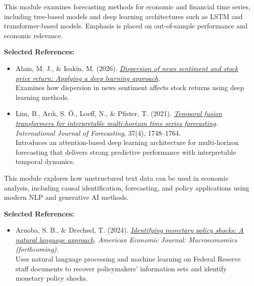 \documentclass[11pt]{article}
\begin{document}
\begin{description}[leftmargin=0cm, labelindent=0cm, itemsep=1em]
\begin{itemize}[leftmargin=1.5em]
\end{itemize}


\item[\textbf{Module 6: Financial and Macroeconomic Forecasting Using ML and Deep Learning}]
This module examines forecasting methods for economic and financial time series, including tree-based models and deep learning architectures such as LSTM and transformer-based models. Emphasis is placed on out-of-sample performance and economic relevance.

\vspace{0.3em}
\textbf{Selected References:}
\begin{itemize}[leftmargin=1.5em]

\item Alam, M. J., \& Isakin, M. (2026).
\href{https://papers.ssrn.com/sol3/papers.cfm?abstract_id=6650318}{\textit{Dispersion of news sentiment and stock price return: Applying a deep learning approach}}. \\ 
Examines how dispersion in news sentiment affects stock returns using deep learning methods.

\item Lim, B., Arık, S. Ö., Loeff, N., \& Pfister, T. (2021).
\href{https://doi.org/10.1016/j.ijforecast.2021.03.012}{\textit{Temporal fusion transformers for interpretable multi-horizon time series forecasting}}.
\textit{International Journal of Forecasting}, 37(4), 1748--1764. \\
Introduces an attention-based deep learning architecture for multi-horizon forecasting that delivers strong predictive performance with interpretable temporal dynamics.

\end{itemize}


\item[\textbf{Module 7: Text Data, NLP, and Generative AI}]
This module explores how unstructured text data can be used in economic analysis, including causal identification, forecasting, and policy applications using modern NLP and generative AI methods.

\vspace{0.3em}
\textbf{Selected References:}
\begin{itemize}[leftmargin=1.5em]

\item Aruoba, S. B., \& Drechsel, T. (2024).
\href{https://www.aeaweb.org/articles?id=10.1257/mac.20240184}{\textit{Identifying monetary policy shocks: A natural language approach}}.
\textit{American Economic Journal: Macroeconomics (forthcoming)}. \\
Uses natural language processing and machine learning on Federal Reserve staff documents to recover policymakers’ information sets and identify monetary policy shocks.


\end{itemize}
\end{description}
\end{document}
